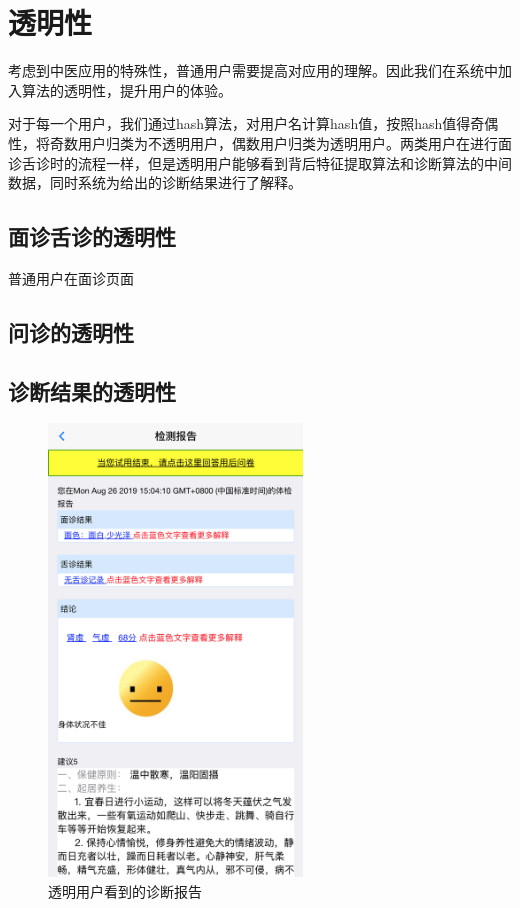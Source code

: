 \section{透明性}
考虑到中医应用的特殊性，普通用户需要提高对应用的理解。因此我们在系统中加入算法的透明性，提升用户的体验。

对于每一个用户，我们通过hash算法，对用户名计算hash值，按照hash值得奇偶性，将奇数用户归类为不透明用户，偶数用户归类为透明用户。两类用户在进行面诊舌诊时的流程一样，但是透明用户能够看到背后特征提取算法和诊断算法的中间数据，同时系统为给出的诊断结果进行了解释。

\subsection{面诊舌诊的透明性}
普通用户在面诊页面

\subsection{问诊的透明性}

\subsection{诊断结果的透明性}
\begin{figure}[ht]
    \centering
    \includegraphics[height=12cm]{images/report3.png}
    \caption{透明用户看到的诊断报告}
    \label{fig:my_label}
\end{figure}

